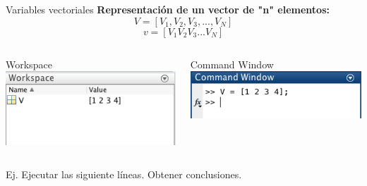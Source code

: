 \documentclass{bredelebeamer}
\begin{document}
\begin{frame}{Variables vectoriales}
\textbf{Representación de un vector de "n" elementos:}
\begin{equation*}
V = [V_1,V_2,V_3,...,V_N]
\end{equation*}
\begin{equation*}
v = [V_1 V_2 V_3 ... V_N]
\end{equation*}
\begin{columns}
\begin{column}{0.5\textwidth}
\begin{center}
Workspace\\
\includegraphics[scale=0.5]{images/pantalla8.png}
\end{center}
\end{column}
\begin{column}{0.5\textwidth}
\begin{center}
Command Window\\
\includegraphics[scale=0.5]{images/pantalla9.png}
\end{center}
\end{column}
\end{columns}
Ej. Ejecutar las siguiente líneas. Obtener conclusiones.

\end{frame}
\end{document}
